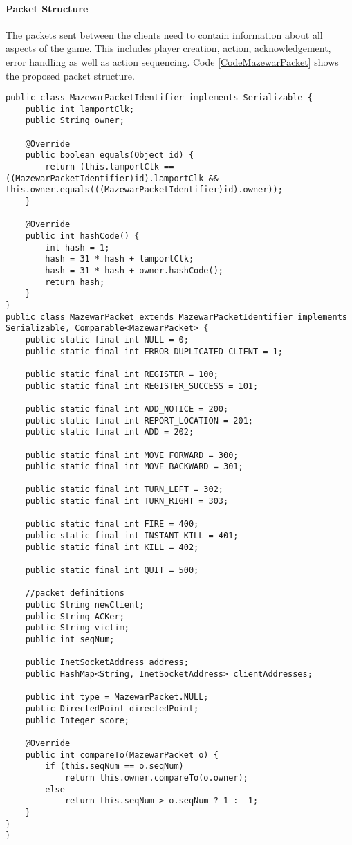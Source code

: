 \paragraph*{Packet Structure} The packets sent between the clients need to contain information about all aspects of the game. This includes player creation, action, acknowledgement, error handling as well as action sequencing. Code \ref{CodeMazewarPacket} shows the proposed packet structure. 
\newpage
{
\singlespacing
\begin{lstlisting}[caption = {[MazewarPacket.java]Structure of packets exchanged between players}, label = CodeMazewarPacket]
public class MazewarPacketIdentifier implements Serializable {
    public int lamportClk;
    public String owner;

    @Override
    public boolean equals(Object id) {
        return (this.lamportClk == ((MazewarPacketIdentifier)id).lamportClk && this.owner.equals(((MazewarPacketIdentifier)id).owner));
    }

    @Override
    public int hashCode() {
        int hash = 1;
        hash = 31 * hash + lamportClk;
        hash = 31 * hash + owner.hashCode();
        return hash;
    }
}
public class MazewarPacket extends MazewarPacketIdentifier implements Serializable, Comparable<MazewarPacket> {
    public static final int NULL = 0;
    public static final int ERROR_DUPLICATED_CLIENT = 1;

    public static final int REGISTER = 100;
    public static final int REGISTER_SUCCESS = 101;

    public static final int ADD_NOTICE = 200;
    public static final int REPORT_LOCATION = 201;
    public static final int ADD = 202;

    public static final int MOVE_FORWARD = 300;
    public static final int MOVE_BACKWARD = 301;

    public static final int TURN_LEFT = 302;
    public static final int TURN_RIGHT = 303;

    public static final int FIRE = 400;
    public static final int INSTANT_KILL = 401;
    public static final int KILL = 402;

    public static final int QUIT = 500;

    //packet definitions
    public String newClient;
    public String ACKer;
    public String victim;
    public int seqNum;

    public InetSocketAddress address;
    public HashMap<String, InetSocketAddress> clientAddresses;

    public int type = MazewarPacket.NULL;
    public DirectedPoint directedPoint;
    public Integer score;

    @Override
    public int compareTo(MazewarPacket o) {
        if (this.seqNum == o.seqNum)
            return this.owner.compareTo(o.owner);
        else
            return this.seqNum > o.seqNum ? 1 : -1;
    }
}
}
\end{lstlisting}
}

